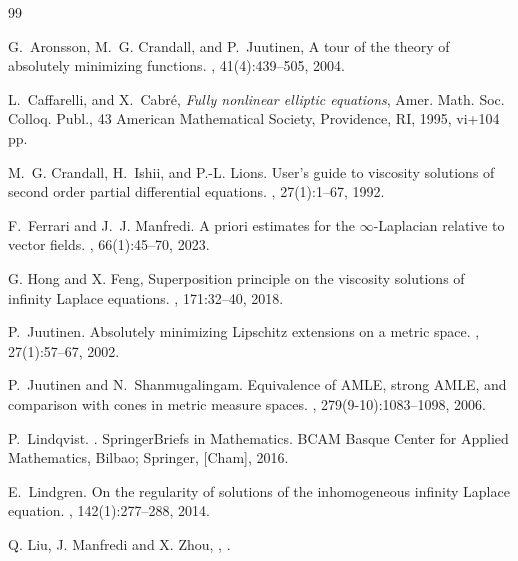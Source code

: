 \documentclass[12pt, reqno]{amsart}
\begin{document}
\begin{thebibliography}{99}


G.~Aronsson, M.~G. Crandall, and P.~Juutinen,
\newblock A tour of the theory of absolutely minimizing functions.
, 41(4):439--505, 2004.

 L.~Caffarelli, and X.~Cabr\'e, 
{\newblock \em Fully nonlinear elliptic equations},
Amer. Math. Soc. Colloq. Publ., 43
American Mathematical Society, Providence, RI, 1995, vi+104 pp.


 M.~G. Crandall, H.~Ishii, and P.-L. Lions.
\newblock User's guide to viscosity solutions of second order partial
  differential equations.
, 27(1):1--67, 1992.

F.~Ferrari and J.~J. Manfredi.
\newblock A priori estimates for the {$\infty$}-{L}aplacian relative to vector
  fields.
, 66(1):45--70, 2023.



 G. Hong and X. Feng, 
\newblock Superposition principle on the viscosity solutions of infinity
  {L}aplace equations.
, 171:32--40, 2018.

P.~Juutinen. 
\newblock Absolutely minimizing Lipschitz extensions on a metric space.
, 27(1):57--67, 2002.

P.~Juutinen and N.~Shanmugalingam.
\newblock Equivalence of {AMLE}, strong {AMLE}, and comparison with cones in
  metric measure spaces.
, 279(9-10):1083--1098, 2006.

P.~Lindqvist.
.
\newblock SpringerBriefs in Mathematics. BCAM Basque Center for Applied
  Mathematics, Bilbao; Springer, [Cham], 2016.


E.~Lindgren.
\newblock On the regularity of solutions of the inhomogeneous infinity
  {L}aplace equation.
, 142(1):277--288, 2014.
 



 Q. Liu, J. Manfredi and X. Zhou, , .







\end{thebibliography}
\end{document}
